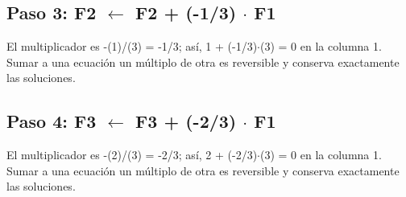 \documentclass[conference]{IEEEtran}
\begin{document}

\medskip
\subsection*{Paso 3: F2 \(\leftarrow\) F2 + (-1/3) \(\cdot\) F1}
El multiplicador es -(1)/(3) = -1/3; así, 1 + (-1/3)\(\cdot\)(3) = 0 en la columna 1. Sumar a una ecuación un múltiplo de otra es reversible y conserva exactamente las soluciones.


\medskip
\subsection*{Paso 4: F3 \(\leftarrow\) F3 + (-2/3) \(\cdot\) F1}
El multiplicador es -(2)/(3) = -2/3; así, 2 + (-2/3)\(\cdot\)(3) = 0 en la columna 1. Sumar a una ecuación un múltiplo de otra es reversible y conserva exactamente las soluciones.

\end{document}
